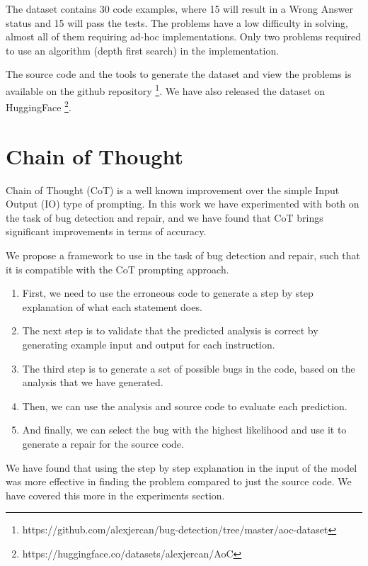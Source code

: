 \documentclass[12pt,a4paper]{report}
\begin{document}
The dataset contains 30 code examples, where 15 will result in a Wrong Answer status and 15 will pass the tests. The problems have a low difficulty in solving, almost all of them requiring ad-hoc implementations. Only two problems required to use an algorithm (depth first search) in the implementation. 

The source code and the tools to generate the dataset and view the problems is available on the github repository \footnote{https://github.com/alexjercan/bug-detection/tree/master/aoc-dataset}. We have also released the dataset on HuggingFace \footnote{https://huggingface.co/datasets/alexjercan/AoC}.

\section{Chain of Thought}

Chain of Thought (CoT) is a well known improvement over the simple Input Output (IO) type of prompting. In this work we have experimented with both on the task of bug detection and repair, and we have found that CoT brings significant improvements in terms of accuracy.

We propose a framework to use in the task of bug detection and repair, such that it is compatible with the CoT prompting approach. 

\begin{enumerate}
  \item First, we need to use the erroneous code to generate a step by step explanation of what each statement does.
  \item The next step is to validate that the predicted analysis is correct by generating example input and output for each instruction.
  \item The third step is to generate a set of possible bugs in the code, based on the analysis that we have generated.
  \item Then, we can use the analysis and source code to evaluate each prediction.
  \item And finally, we can select the bug with the highest likelihood and use it to generate a repair for the source code.
\end{enumerate}

We have found that using the step by step explanation in the input of the model was more effective in finding the problem compared to just the source code. We have covered this more in the experiments section.
\end{document}
